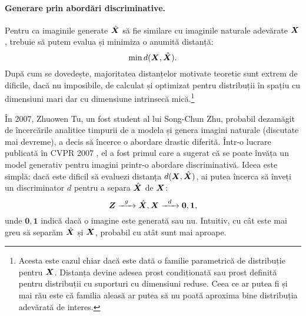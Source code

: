 \documentclass[../../book-main_ro.tex]{subfiles}
\begin{document}
\paragraph{Generare prin abordări discriminative.}
Pentru ca imaginile generate $\hat {\bm{X}}$ să fie similare cu imaginile naturale adevărate $\bm{X}$, trebuie să putem evalua și minimiza o anumită distanță:
\begin{equation}
    \min d(\bm{X}, \hat {\bm{X}}).
\end{equation}
După cum se dovedește, majoritatea distanțelor motivate teoretic sunt extrem de dificile, dacă nu imposibile, de calculat și optimizat pentru distribuții în spațiu cu dimensiuni mari dar cu dimensiune intrinsecă mică.\footnote{Acesta este cazul chiar dacă este dată o familie parametrică de distribuție pentru $\bm{X}$. Distanța devine adesea prost condiționată sau prost definită pentru distribuții cu suporturi cu dimensiuni reduse. Ceea ce ar putea fi și mai rău este că familia aleasă ar putea să nu poată aproxima bine distribuția adevărată de interes.}

În 2007, Zhuowen Tu, un fost student al lui Song-Chun Zhu, probabil dezamăgit de încercările analitice timpurii de a modela și genera imagini naturale (discutate mai devreme), a decis să încerce o abordare drastic diferită. Într-o lucrare publicată în CVPR 2007 \cite{Tu-2007}, el a fost primul care a sugerat că se poate învăța un model generativ pentru imagini printr-o abordare discriminativă. Ideea este simplă: dacă este dificil să evaluezi distanța $d(\bm{X}, \hat {\bm{X}})$, ai putea încerca să înveți un discriminator $d$ pentru a separa $\hat {\bm{X}}$ de $\bm{X}$:
\begin{equation}
    \bm{Z}   \xrightarrow{\hspace{2mm} g  \hspace{2mm}} \hat {\bm{X}}, \bm{X} \xrightarrow{\hspace{2mm} d  \hspace{2mm}} \boldsymbol{0}, \boldsymbol{1},
       \label{eqn:gan-networks}
\end{equation}
unde $\boldsymbol{0}, \boldsymbol{1}$ indică dacă o imagine este generată sau nu.
Intuitiv, cu cât este mai greu să separăm $\hat {\bm{X}}$ și $\bm{X}$, probabil cu atât sunt mai aproape.
\end{document}
